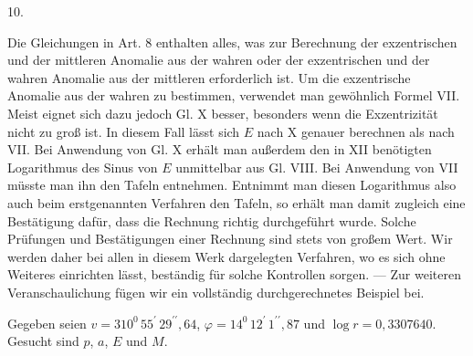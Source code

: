 \par{}
\begin{center}
10.
\end{center}
Die Gleichungen in Art. 8 enthalten alles, was zur Berechnung der exzentrischen und
der mittleren Anomalie aus der wahren oder der exzentrischen und der wahren Anomalie
aus der mittleren erforderlich ist. Um die exzentrische Anomalie aus der wahren zu
bestimmen, verwendet man gewöhnlich Formel VII. Meist eignet sich dazu jedoch Gl. X
besser, besonders wenn die Exzentrizität nicht zu groß ist. In diesem Fall lässt sich
$E$ nach X genauer berechnen als nach VII. Bei Anwendung von Gl. X erhält man außerdem
den in XII benötigten Logarithmus des Sinus von $E$ unmittelbar aus Gl. VIII. Bei
Anwendung von VII müsste man ihn den Tafeln entnehmen. Entnimmt man diesen Logarithmus
also auch beim erstgenannten Verfahren den Tafeln, so erhält man damit zugleich eine
Bestätigung dafür, dass die Rechnung richtig durchgeführt wurde. Solche Prüfungen
und Bestätigungen einer Rechnung sind stets von großem Wert. Wir werden daher bei
allen in diesem Werk dargelegten Verfahren, wo es sich ohne Weiteres einrichten lässt,
beständig für solche Kontrollen sorgen.
--- Zur weiteren Veranschaulichung fügen wir ein vollständig durchgerechnetes Beispiel bei.

Gegeben seien $v = 310^0\,55^{\prime}\,29^{\prime\prime}{,}64$, $\varphi = 14^0\,12^{\prime}\,1^{\prime\prime}{,}87$ und $\log r = 0{,}3307640$. Gesucht sind $p$, $a$, $E$ und $M$.


